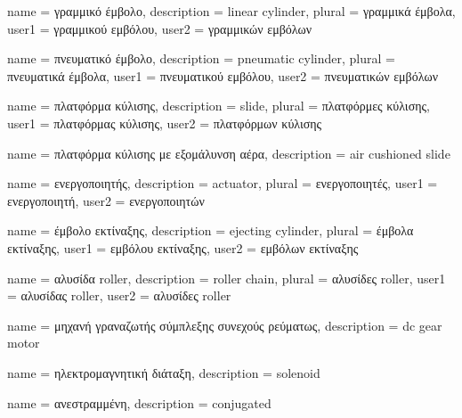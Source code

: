 	{name			= {γραμμικό έμβολο},
	 description	= {linear cylinder},
	 plural			= {γραμμικά έμβολα},
	 user1			= {γραμμικού εμβόλου},
	 user2			= {γραμμικών εμβόλων}
	}
	
	{name			= {πνευματικό έμβολο},
	 description	= {pneumatic cylinder},
	 plural			= {πνευματικά έμβολα},
	 user1			= {πνευματικού εμβόλου},
	 user2			= {πνευματικών εμβόλων}
	}
		
	{name			= {πλατφόρμα κύλισης},
	 description	= {slide},
	 plural			= {πλατφόρμες κύλισης},
	 user1			= {πλατφόρμας κύλισης},
	 user2			= {πλατφόρμων κύλισης}
	}
	
	{name			= {πλατφόρμα κύλισης με εξομάλυνση αέρα},
	 description	= {air cushioned slide}
	}
	
	{name			= {ενεργοποιητής},
	 description	= {actuator},
	 plural			= {ενεργοποιητές},
	 user1			= {ενεργοποιητή},
	 user2			= {ενεργοποιητών}
	}
	
	{name			= {έμβολο εκτίναξης},
	 description	= {ejecting cylinder},
	 plural			= {έμβολα εκτίναξης},
	 user1			= {εμβόλου εκτίναξης},
	 user2			= {εμβόλων εκτίναξης}
	}

	{name			= {αλυσίδα roller},
	 description	= {roller chain},
	 plural			= {αλυσίδες roller},
	 user1			= {αλυσίδας roller},
	 user2			= {αλυσίδες roller}
	}
	
	{name			= {μηχανή γραναζωτής σύμπλεξης συνεχούς ρεύματως},
	 description	= {dc gear motor}
	}
	
	{name			= {ηλεκτρομαγνητική διάταξη},
	 description	= {solenoid}
	}
	
	{name			= {ανεστραμμένη},
	 description	= {conjugated}
	}